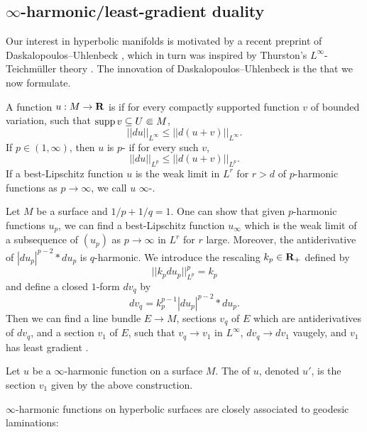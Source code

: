 
\subsection{$\infty$-harmonic/least-gradient duality}
Our interest in hyperbolic manifolds is motivated by a recent preprint of Daskalopoulos--Uhlenbeck \cite{daskalopoulos2020transverse}, which in turn was inspired by Thurston's $L^\infty$-Teichm\"uller theory \cite{thurston1998minimal}.
The innovation of Daskalopoulos--Uhlenbeck is the  that we now formulate.

\begin{definition}
A function $u: M \to \mathbf{R}$ is  if for every compactly supported function $v$ of bounded variation, such that $\operatorname{supp} v \subseteq U \Subset M$,
$$||du||_{L^\infty} \leq ||d(u + v)||_{L^\infty}.$$
If $p \in (1, \infty)$, then $u$ is $p$- if for every such $v$,
$$||du||_{L^p} \leq ||d(u + v)||_{L^p}.$$
If a best-Lipschitz function $u$ is the weak limit in $L^r$ for $r > d$ of $p$-harmonic functions as $p \to \infty$, we call $u$ $\infty$-.
\end{definition}

Let $M$ be a surface and $1/p + 1/q = 1$.
One can show \cite[Theorem 2.4]{daskalopoulos2020transverse} that given $p$-harmonic functions $u_p$, we can find a best-Lipschitz function $u_\infty$ which is the weak limit of a subsequence of $(u_p)$ as $p \to \infty$ in $L^r$ for $r$ large.
Moreover, the antiderivative of $|du_p|^{p - 2} * du_p$ is $q$-harmonic.
We introduce the rescaling $k_p \in \mathbf{R}_+$ defined by 
$$||k_p du_p||_{L^p}^p = k_p$$
and define a closed $1$-form $dv_q$ by
$$dv_q = k_p^{p - 1} |du_p|^{p - 2} * du_p.$$
Then we can find a line bundle $E \to M$, sections $v_q$ of $E$ which are antiderivatives of $dv_q$, and a section $v_1$ of $E$, such that $v_q \to v_1$ in $L^\infty$, $dv_q \to dv_1$ vaugely, and $v_1$ has least gradient \cite[Theorem 6.10]{daskalopoulos2020transverse}.

\begin{definition}
Let $u$ be a $\infty$-harmonic function on a surface $M$. The  of $u$, denoted $u'$, is the section $v_1$ given by the above construction.
\end{definition}

$\infty$-harmonic functions on hyperbolic surfaces are closely associated to geodesic laminations:

